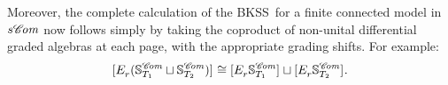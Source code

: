 \documentclass[11pt]{amsart} \renewcommand{\baselinestretch}{1.2}
\theoremstyle{plain}
\newtheorem{lem}[thm]{Lemma}
\numberwithin{equation}{section} %
\theoremstyle{plain}
\newtheorem{lem}[thm]{Lemma}
\numberwithin{equation}{chapter} %
\renewcommand{\to}{\longrightarrow}
\newcommand{\scrC}{\mathscr{C}}
\newcommand{\produces}[3]{#3:#1\sim #2}
\renewcommand{\produces}[3]{#1\rightarrow_{#3} #2}%
\renewcommand{\produces}[3]{#1\overset{\smash{#3}}{\rightarrow} #2}%
\newcommand{\Sq}{\mathrm{Sq}}
\newcommand{\algs}{{\scrC\!\textit{\normalfont\textit{om}}}}
\newcommand{\E}[5]{[E^{#1}_{#2}#3]^{#4}_{#5}}
\newcommand{\uver}{^\mathrm{v}}
\newcommand{\dhor}{_\mathrm{h}}
\newcommand{\Sqh}{\mathrm{Sq}\dhor}
\newcommand{\deltav}{\delta\uver}
\renewcommand{\mapsto}{\longmapsto}
\newcommand{\BKSS}{BKSS}
\begin{document}
\begin{The Bousfield-Kan spectral sequence for a sphere}
Moreover, the complete calculation of the \BKSS\ for a finite connected model in $s\algs$ now follows simply by taking the coproduct of non-unital differential graded algebras at each page, with the appropriate grading shifts. For example:
\[\E{}{r}{(\mathbb{S}_{T_1}^\algs\sqcup \mathbb{S}_{T_2}^\algs)}{}{}\cong \E{}{r}{\mathbb{S}_{T_1}^\algs}{}{}\sqcup \E{}{r}{\mathbb{S}_{T_2}^\algs}{}{}.\]


%
%
%
%
%
%
%
%
%
%
%
%



\end{The Bousfield-Kan spectral sequence for a sphere}
\end{document}
